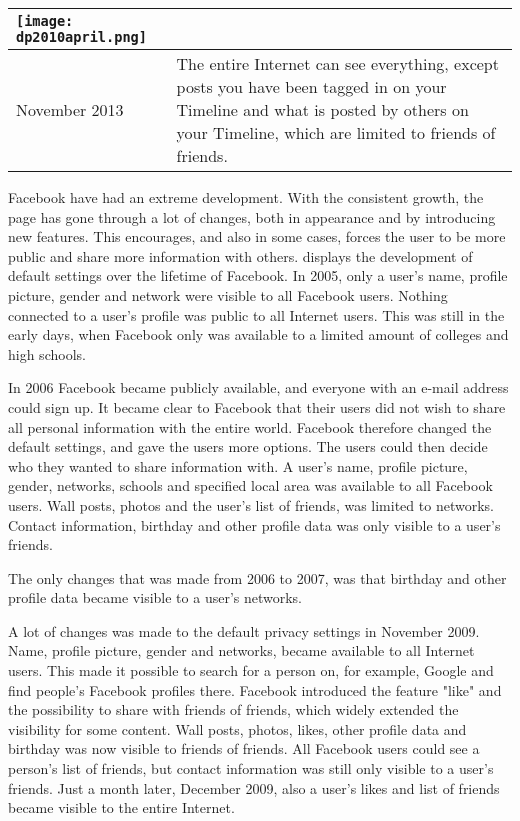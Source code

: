 \begin{center}
\begin{longtable}{ | p{1.3cm} | p{10.6cm} |}
    \texttt{[image: dp2010april.png]} \\
    \hline
    November 2013 & The entire Internet can see everything, except posts you have been tagged in on your Timeline and what is posted by others on your Timeline, which are limited to friends of friends. \\ 
    \hline
   \end{longtable}
\end{center} 


Facebook have had an extreme development. With the consistent growth, the page has gone through a lot of changes, both in appearance and by introducing new features. This encourages, and also in some cases, forces the user to be more public and share more information with others.  displays the development of default settings over the lifetime of Facebook. In 2005, only a user's name, profile picture, gender and network were visible to all Facebook users. Nothing connected to a user's profile was public to all Internet users. This was still in the early days, when Facebook only was available to a limited amount of colleges and high schools.

In 2006 Facebook became publicly available, and everyone with an e-mail address could sign up. It became clear to Facebook that their users did not wish to share all personal information with the entire world. Facebook therefore changed the default settings, and gave the users more options. The users could then decide who they wanted to share information with. A user's name, profile picture, gender, networks, schools and specified local area was available to all Facebook users. Wall posts, photos and the user's list of friends, was limited to networks. Contact information, birthday and other profile data was only visible to a user's friends. 

The only changes that was made from 2006 to 2007, was that birthday and other profile data became visible to a user's networks.

A lot of changes was made to the default privacy settings in November 2009. Name, profile picture, gender and networks, became available to all Internet users. This made it possible to search for a person on, for example, Google and find people's Facebook profiles there. Facebook introduced the feature "like" and the possibility to share with friends of friends, which widely extended the visibility for some content. Wall posts, photos, likes, other profile data and birthday was now visible to friends of friends. All Facebook users could see a person's list of friends, but contact information was still only visible to a user's friends. Just a month later, December 2009, also a user's likes and list of friends became visible to the entire Internet. 

